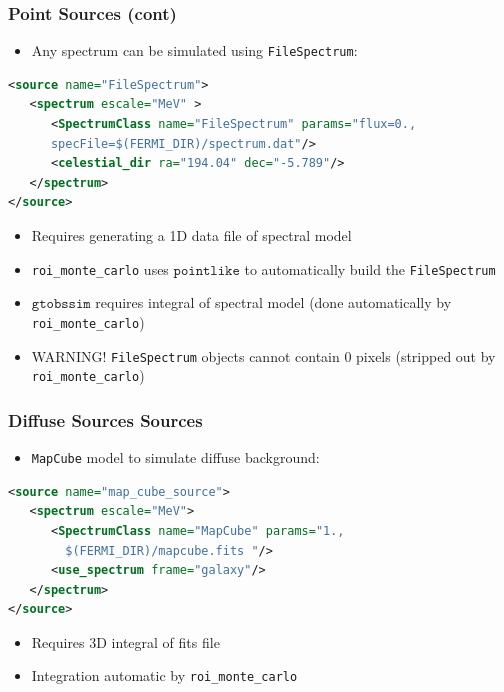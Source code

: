 \documentclass[12pt]{beamer}
\newcommand{\pointlike}{\ensuremath{\mathtt{pointlike}}\xspace}
\newcommand{\gtobssim}{\ensuremath{\mathtt{gtobssim}}\xspace}
\newcommand{\roimc}{\texttt{roi\_monte\_carlo}\xspace}
\newcommand{\mapcube}{\texttt{MapCube}\xspace}
\begin{document}
\begin{frame}[fragile]
  \frametitle{Point Sources (cont)}
  \begin{itemize}
    \item Any spectrum can be simulated using \texttt{FileSpectrum}:
  \end{itemize}

  \begin{lstlisting}[language=XML]
<source name="FileSpectrum">
   <spectrum escale="MeV" >
      <SpectrumClass name="FileSpectrum" params="flux=0.,
      specFile=$(FERMI_DIR)/spectrum.dat"/>
      <celestial_dir ra="194.04" dec="-5.789"/>
   </spectrum>
</source>
  \end{lstlisting}

  \begin{itemize}
    \item Requires generating a 1D data file of spectral model
    \item \roimc uses \pointlike to automatically build the \texttt{FileSpectrum} 
    \item \gtobssim requires integral of spectral model (done automatically by \roimc)
    \item WARNING! \texttt{FileSpectrum} objects cannot contain 0 pixels (stripped out by \roimc)
  \end{itemize}
\end{frame}


\begin{frame}[fragile]
  \frametitle{Diffuse Sources Sources}
  \begin{itemize}
  \item \mapcube model to simulate diffuse background:
  \end{itemize}
\begin{lstlisting}[language=XML]
<source name="map_cube_source">
   <spectrum escale="MeV">
      <SpectrumClass name="MapCube" params="1., 
        $(FERMI_DIR)/mapcube.fits "/>
      <use_spectrum frame="galaxy"/>
   </spectrum>
</source>
\end{lstlisting}
  \begin{itemize}
    \item Requires 3D integral of fits file
    \item Integration automatic by \roimc
  \end{itemize}
\end{frame}
\end{document}
